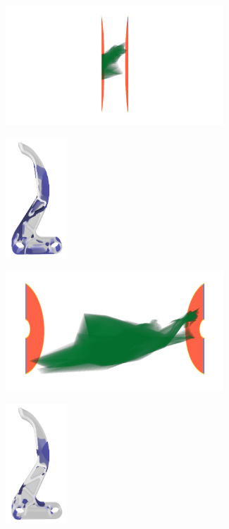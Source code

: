 \documentclass[a4paper,fontsize=12pt,toc=bib,halfparskip]{scrartcl}
\begin{document}
\begin{figure}
	\begin{subfigure}{0.49\textwidth}
		\centering
		\includegraphics[height=4.5cm]{pictures/results/Bremshebel_K_InvariantSpace1.png}
		\subcaption{}
		\label{BremshebelKInvariant1}
	\end{subfigure}
	\hspace*{\fill}
	\begin{subfigure}{0.49\textwidth}
		\centering
		\includegraphics[height=4.5cm]{pictures/results/Bremshebel_K_Object1.png}
		\subcaption{}
		\label{BremshebelKObject1}
	\end{subfigure}
	\medskip
	\begin{subfigure}{0.49\textwidth}
		\centering
		\includegraphics[height=4.5cm]{pictures/results/Bremshebel_K_InvariantSpace2.png}
		\subcaption{}
		\label{BremshebelKInvariant2}
	\end{subfigure}
	\hspace*{\fill}
	\begin{subfigure}{0.49\textwidth}
		\centering
		\includegraphics[height=4.5cm]{pictures/results/Bremshebel_K_Object2.png}

\end{subfigure}
\end{figure}
\end{document}

